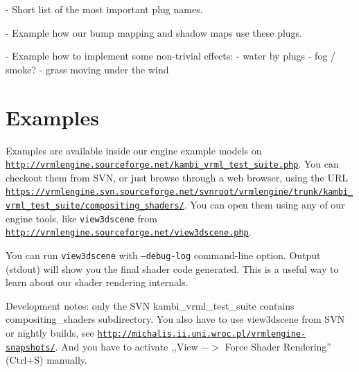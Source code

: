 \documentclass{acmsiggraph}                     %
\newcommand*{\myhref}[2]{\texttt{\href{#1}{\nolinkurl{#2}}}}
\begin{document}
- Short list of the most important plug names.

- Example how our bump mapping and shadow maps use these plugs.

- Example how to implement some non-trivial effects:
  - water by plugs
  - fog / smoke?
  - grass moving under the wind

\section{Examples}

Examples are available inside our engine example models on
\myhref{http://vrmlengine.sourceforge.net/kambi\_vrml\_test\_suite.php}{http://vrmlengine.sourceforge.net/kambi_vrml_test_suite.php}.
You can checkout them from SVN, or just browse through a web browser,
using the URL
\myhref{https://vrmlengine.svn.sourceforge.net/svnroot/vrmlengine/trunk/kambi\_vrml\_test\_suite/compositing\_shaders/}{https://vrmlengine.svn.sourceforge.net/svnroot/vrmlengine/trunk/kambi_vrml_test_suite/compositing_shaders/}.
You can open them using any of our engine tools,
like \texttt{view3dscene} from
\myhref{http://vrmlengine.sourceforge.net/view3dscene.php}{http://vrmlengine.sourceforge.net/view3dscene.php}.

You can run \texttt{view3dscene} with \texttt{--debug-log} command-line
option. Output (stdout) will show you the final shader code generated.
This is a useful way to learn about our shader rendering internals.

Development notes: only the SVN kambi\_vrml\_test\_suite contains
compositing\_shaders subdirectory.
You also have to use view3dscene from SVN or nightly builds,
see \myhref{http://michalis.ii.uni.wroc.pl/vrmlengine-snapshots/}{http://michalis.ii.uni.wroc.pl/vrmlengine-snapshots/}.
And you have to activate ,,View $->$ Force Shader Rendering'' (Ctrl+S) manually.


\nocite{*}

\end{document}
